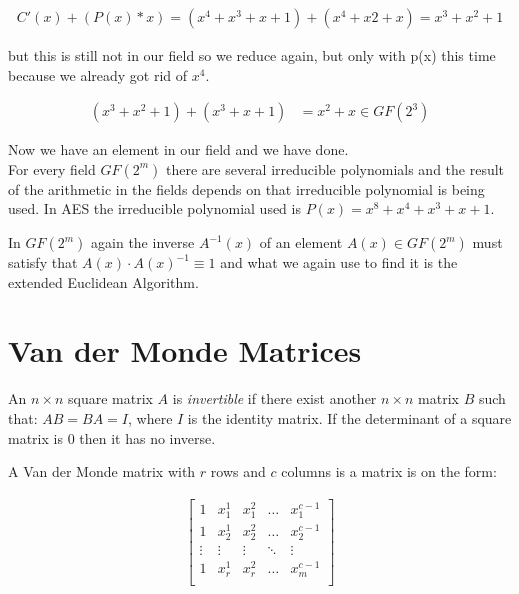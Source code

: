 \begin{align*}
    C'(x) + (P(x)*x) = (x^4 + x^3 + x + 1) + (x^4+x2+x) = x^3+x^2+1 
\end{align*}

 \noindent but this is still not in our field so we reduce again, but only with p(x) this time because we already got rid of $x^4$.
 
 \begin{align*}
    (x^3+x^2+1) + (x^3+x+1) &= x^2 + x \in GF(2^3)
\end{align*}

\noindent Now we have an element in our field and we have done. \\ 
For every field $GF(2^m)$ there are several irreducible polynomials and the result of the arithmetic in the fields depends on that irreducible polynomial is being used. In AES the irreducible polynomial used is $P(x)=x^8+x^4+x^3+x+1$.

In $GF(2^m)$ again the inverse $A^{-1}(x)$ of an element $A(x) \in GF(2^m)$ must satisfy that $A(x) \cdot A(x)^{-1} \equiv 1$ and what we again use to find it is the extended Euclidean Algorithm.

\section{Van der Monde Matrices}

\begin{mydef}
An $n \times n$ square matrix $A$ is \emph{invertible} if there exist another $n \times n$ matrix $B$ such that: $AB=BA=I$, where $I$ is the identity matrix. If the determinant of a square matrix is $0$ then it has no inverse.
\end{mydef}

A Van der Monde matrix with $r$ rows and $c$ columns is a matrix is on the form:

\begin{align*}
\begin{bmatrix}
    1       & x_1^1     & x_1^2     & \dots     & x_1^{c-1} \\
    1       & x_2^1     & x_2^2     & \dots     & x_2^{c-1} \\
    \vdots  & \vdots    & \vdots    & \ddots    & \vdots    \\
    1       & x_r^1     & x_r^2     & \dots     & x_m^{c-1} \\
\end{bmatrix}   
\end{align*}

